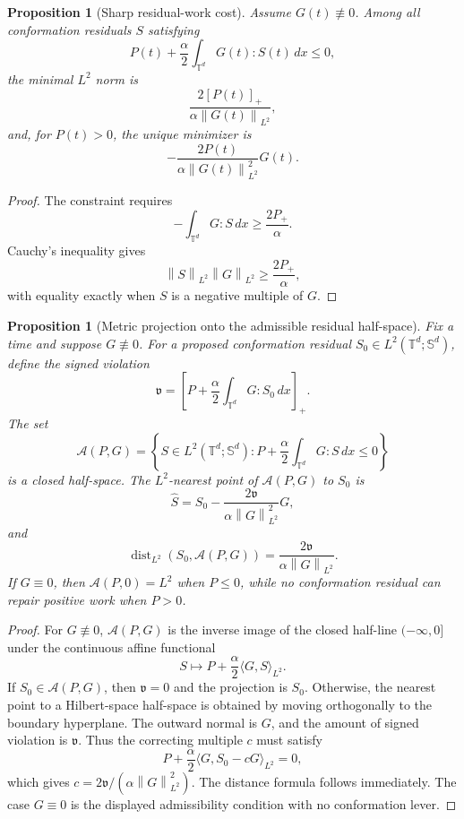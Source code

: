 \documentclass[11pt]{article}
\numberwithin{equation}{section}
\newtheorem{proposition}[theorem]{Proposition}
\newcommand{\T}{\mathbb T}
\newcommand{\Sym}{\mathbb S}
\newcommand{\calA}{\mathcal A}
\newcommand{\norm}[1]{\left\lVert #1\right\rVert}
\begin{document}
\begin{proposition}[Sharp residual-work cost]
\label{prop:sharp-cost}
Assume \(G(t)\not\equiv0\).  Among all conformation residuals \(S\) satisfying
\[
  P(t)+\frac{\alpha}{2}\int_{\T^d}G(t):S(t)\,dx\le0,
\]
the minimal \(L^2\) norm is
\[
  \frac{2[P(t)]_+}{\alpha\norm{G(t)}_{L^2}},
\]
and, for \(P(t)>0\), the unique minimizer is
\[
  -\frac{2P(t)}{\alpha\norm{G(t)}_{L^2}^2}G(t).
\]
\end{proposition}

\begin{proof}
The constraint requires
\[
  -\int_{\T^d}G:S\,dx\ge \frac{2P_+}{\alpha}.
\]
Cauchy's inequality gives
\[
  \norm{S}_{L^2}\norm{G}_{L^2}
  \ge \frac{2P_+}{\alpha},
\]
with equality exactly when \(S\) is a negative multiple of \(G\).
\end{proof}


\begin{proposition}[Metric projection onto the admissible residual half-space]
\label{prop:metric-projection}
Fix a time and suppose \(G\not\equiv0\).  For a proposed conformation residual
\(S_0\in L^2(\T^d;\Sym^d)\), define the signed violation
\[
  \mathfrak v
  =
  \left[P+\frac{\alpha}{2}\int_{\T^d}G:S_0\,dx\right]_+ .
\]
The set
\[
  \calA(P,G)=\left\{S\in L^2(\T^d;\Sym^d):
  P+\frac{\alpha}{2}\int_{\T^d}G:S\,dx\le0\right\}
\]
is a closed half-space.  The \(L^2\)-nearest point of \(\calA(P,G)\) to \(S_0\)
is
\[
  \widehat S
  =
  S_0-\frac{2\mathfrak v}{\alpha\norm{G}_{L^2}^2}G,
\]
and
\[
  \operatorname{dist}_{L^2}(S_0,\calA(P,G))
  =
  \frac{2\mathfrak v}{\alpha\norm{G}_{L^2}}.
\]
If \(G\equiv0\), then \(\calA(P,0)=L^2\) when \(P\le0\), while no
conformation residual can repair positive work when \(P>0\).
\end{proposition}

\begin{proof}
For \(G\not\equiv0\), \(\calA(P,G)\) is the inverse image of the closed half-line
\((-\infty,0]\) under the continuous affine functional
\[
  S\mapsto P+\frac{\alpha}{2}\langle G,S\rangle_{L^2}.
\]
If \(S_0\in\calA(P,G)\), then \(\mathfrak v=0\) and the projection is \(S_0\).
Otherwise, the nearest point to a Hilbert-space half-space is obtained by moving
orthogonally to the boundary hyperplane.  The outward normal is \(G\), and the
amount of signed violation is \(\mathfrak v\).  Thus the correcting multiple
\(c\) must satisfy
\[
  P+\frac{\alpha}{2}\langle G,S_0-cG\rangle_{L^2}=0,
\]
which gives \(c=2\mathfrak v/(\alpha\norm{G}_{L^2}^2)\).  The distance formula
follows immediately.  The case \(G\equiv0\) is the displayed admissibility
condition with no conformation lever.
\end{proof}
\end{document}
